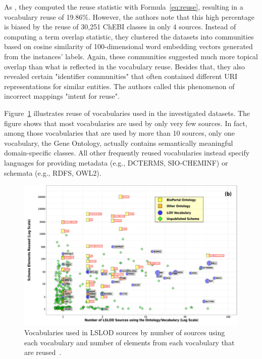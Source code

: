 \documentclass[runningheads]{llncs}
\begin{document}
    As \citet{kamdar2017systematic}, they computed the reuse statistic with Formula~\ref{eq:reuse}, resulting in a vocabulary reuse of 19.86\%.
    However, the authors note that this high percentage is biased by the reuse of 30,251 ChEBI classes in only 4 sources.
    Instead of computing a term overlap statistic, they clustered the datasets into communities based on cosine similarity of 100-dimensional word embedding vectors generated from the instances' labels.
    Again, these communities suggested much more topical overlap than what is reflected in the vocabulary reuse.
    Besides that, they also revealed certain "identifier communities" that often contained different URI representations for similar entities.
    The authors called this phenomenon of incorrect mappings "intent for reuse".

    Figure~\ref{fig:vocabulary_reuse} illustrates reuse of vocabularies used in the investigated datasets.
    The figure shows that most vocabularies are used by only very few sources.
    In fact, among those vocabularies that are used by more than 10 sources, only one vocabulary, the Gene Ontology, actually contains semantically meaningful domain-specific classes.
    All other frequently reused vocabularies instead specify languages for providing metadata (e.g., DCTERMS, SIO-CHEMINF) or schemata (e.g., RDFS, OWL2).

    \begin{figure}[ht]
        \centering
        \includegraphics[width=\textwidth]{figures/vocabulary-reuse}
        \caption{Vocabularies used in LSLOD sources by number of sources using each vocabulary and number of elements from each vocabulary that are reused~\citep{kamdar2021empirical}.}
        \label{fig:vocabulary_reuse}
    \end{figure}
\end{document}
